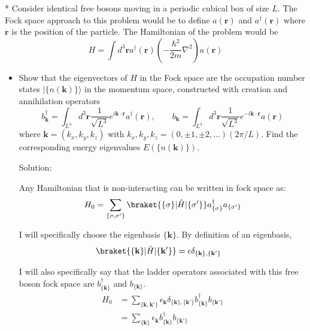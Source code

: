 \begin{homeworkProblem}
    * Consider identical free bosons moving in a periodic cubical box of size $L$. The Fock space approach to this problem would be to define $a(\mathbf{r})$ and $a^{\dagger}(\mathbf{r})$ where $\mathbf{r}$ is the position of the particle. The Hamiltonian of the problem would be
    $$
    H=\int d^3 \mathbf{r} a^{\dagger}(\mathbf{r})\left(-\frac{\hbar^2}{2 m} \nabla^2\right) a(\mathbf{r})
    $$
    \begin{itemize}
        \item[(a)] Show that the eigenvectors of $H$ in the Fock space are the occupation number states $|\{n(\mathbf{k})\}\rangle$ in the momentum space, constructed with creation and annihilation operators
            $$
            b_{\mathbf{k}}^{\dagger}=\int_{L^3} d^3 \mathbf{r} \frac{1}{\sqrt{L^3}} e^{i \mathbf{k} \cdot \mathbf{r}} a^{\dagger}(\mathbf{r}),
            \qquad 
            b_{\mathbf{k}}=\int_{L^3} d^3 \mathbf{r} \frac{1}{\sqrt{L^3}} e^{-i \mathbf{k} \cdot \mathbf{r}} a(\mathbf{r})
            $$
            where $\mathbf{k}=\left(k_x, k_y, k_z\right)$ with $k_x, k_y, k_z=(0, \pm 1, \pm 2, \ldots)(2 \pi / L)$. Find the corresponding energy eigenvalues $E(\{n(\mathbf{k})\})$.

            \begin{callout}{Solution:}

                Any Hamiltonian that is non-interacting can be written in fock space as:
                $$H_{0}=\sum_{\{ \sigma,\sigma' \}}\braket{ \{ \sigma  \}| \hat{H}|\{ \sigma' \}}a^{\dagger}_{\{ \sigma \}}a_{\{ \sigma' \}}$$

                I will specifically choose the eigenbasis $\{ \mathbf{k} \}$. By definition of an eigenbasis,
                \begin{align*}
                    \braket{ \{ \mathbf{k} \} | \hat{H} |\{ \mathbf{k}' \}} &=\epsilon \delta_{\{ \mathbf{k} \},\{ \mathbf{k}' \}}
                \end{align*}

                I will also specifically say that the ladder operators associated with this free boson fock space are $b_{\{\mathbf{k}\}}^\dagger$ and $b_{\{\mathbf{k}\}}$.
                \begin{align*}
                    H_{0}&=\sum_{\{ \mathbf{k},\mathbf{k}' \}} \epsilon_{\mathbf{k}} \delta_{\{ \mathbf{k} \},\{ \mathbf{k}' \}} b_{\{\mathbf{k}\}}^\dagger b_{\{\mathbf{k}'\}} \\
                         &=\sum_{\{ \mathbf{k} \}} \epsilon_{\mathbf{k}} b_{\{\mathbf{k}\}}^\dagger b_{\{\mathbf{k}'\}}
                \end{align*}


\end{callout}
\end{itemize}
\end{homeworkProblem}
